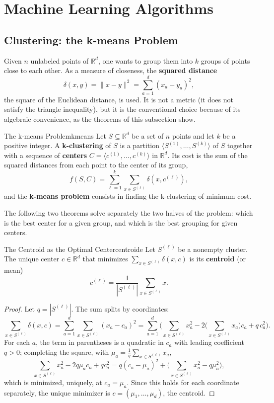 \documentclass[11pt, a4paper]{article}
\begin{document}
\newpage

\section{Machine Learning Algorithms}

\subsection{Clustering: the k-means Problem}

Given $n$ unlabeled points of $\mathbb{R}^d$, one wants to group them into $k$ groups of points close to each other. As a measure of closeness, the \textbf{squared distance}
\[
\delta(x, y) = \|x - y\|^2 = \sum_{a=1}^{d} (x_a - y_a)^2,
\]
the square of the Euclidean distance, is used. It is not a metric (it does not satisfy the triangle inequality), but it is the conventional choice because of its algebraic convenience, as the theorems of this subsection show.

\begin{definicion}{The k-means Problem}{kmeans}
Let $S \subseteq \mathbb{R}^d$ be a set of $n$ points and let $k$ be a positive integer. A \textbf{k-clustering} of $S$ is a partition $\langle S^{(1)}, \dots, S^{(k)} \rangle$ of $S$ together with a sequence of \textbf{centers} $C = \langle c^{(1)}, \dots, c^{(k)} \rangle$ in $\mathbb{R}^d$. Its cost is the sum of the squared distances from each point to the center of its group,
\[
f(S, C) = \sum_{\ell=1}^{k} \sum_{x \in S^{(\ell)}} \delta(x, c^{(\ell)}),
\]
and the \textbf{k-means problem} consists in finding the k-clustering of minimum cost.
\end{definicion}

The following two theorems solve separately the two halves of the problem: which is the best center for a given group, and which is the best grouping for given centers.

\begin{teorema}{The Centroid as the Optimal Center}{centroide}
Let $S^{(\ell)}$ be a nonempty cluster. The unique center $c \in \mathbb{R}^d$ that minimizes $\sum_{x \in S^{(\ell)}} \delta(x, c)$ is its \textbf{centroid} (or mean)
\[
c^{(\ell)} = \frac{1}{|S^{(\ell)}|} \sum_{x \in S^{(\ell)}} x.
\]
\end{teorema}

\begin{proof}
Let $q = |S^{(\ell)}|$. The sum splits by coordinates:
\[
\sum_{x \in S^{(\ell)}} \delta(x, c) = \sum_{a=1}^{d} \sum_{x \in S^{(\ell)}} (x_a - c_a)^2
= \sum_{a=1}^{d} \Bigg( \sum_{x \in S^{(\ell)}} x_a^2 - 2 \Big( \sum_{x \in S^{(\ell)}} x_a \Big) c_a + q \, c_a^2 \Bigg).
\]
For each $a$, the term in parentheses is a quadratic in $c_a$ with leading coefficient $q > 0$; completing the square, with $\mu_a = \frac{1}{q} \sum_{x \in S^{(\ell)}} x_a$,
\[
\sum_{x \in S^{(\ell)}} x_a^2 - 2 q \mu_a c_a + q c_a^2 = q (c_a - \mu_a)^2 + \Big( \sum_{x \in S^{(\ell)}} x_a^2 - q \mu_a^2 \Big),
\]
which is minimized, uniquely, at $c_a = \mu_a$. Since this holds for each coordinate separately, the unique minimizer is $c = (\mu_1, \dots, \mu_d)$, the centroid.
\end{proof}
\end{document}
